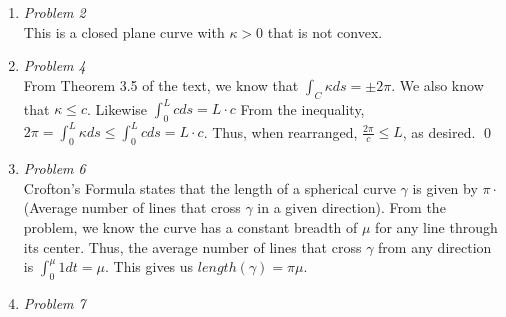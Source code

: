 \documentclass{article}
\begin{document}
\begin{enumerate}
\item \textit{Problem 2}\\
This is a closed plane curve with $\kappa>0$ that is not convex.
\begin{center}
\end{center}

\item \textit{Problem 4}\\

From Theorem 3.5 of the text, we know that $\displaystyle\int_C \kappa ds = \pm 2\pi$.
We also know that $\kappa \leq c$. 
Likewise $\displaystyle\int_0^L c ds = L\cdot c$
From the inequality, $2\pi =\displaystyle\int_0^L \kappa ds \leq \displaystyle\int_0^L c ds = L \cdot c$.
Thus, when rearranged, $\frac{2\pi}{c} \leq L$, as desired. \qed

\item \textit{Problem 6}\\
Crofton's Formula states that the length of a spherical curve $\gamma$ is given by $\pi \cdot$(Average number of lines that cross $\gamma$ in a given direction).
From the problem, we know the curve has a constant breadth of $\mu$ for any line through its center.
Thus, the average number of lines that cross $\gamma$ from any direction is $\displaystyle\int_0^{\mu} 1 dt = \mu$.
This gives us $length(\gamma) = \pi\mu$.

\item \textit{Problem 7}\\

\begin{enumerate}


\end{enumerate}
\end{enumerate}
\end{document}
